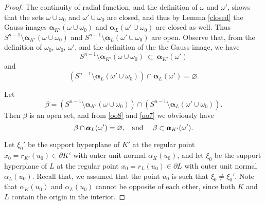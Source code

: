 \documentclass{cpamart1}     %
\theoremstyle{definition}
\theoremstyle{remark}
\newcommand{\sn}{S^{n-1}}
\newcommand{\balpha}{\pmb{\alpha}}
\begin{document}
\begin{proof}
The continuity of radial function,
and the definition of $\omega$ and $\omega'$, shows that the sets
$\omega \cup \omega_0$ and $\omega'\cup \omega_0$ are
closed, and thus by Lemma \ref{closed} the Gauss images $\balpha_{K'}(\omega \cup \omega_0)$
and $\balpha_{L}(\omega' \cup \omega_0)$ are closed as well.
Thus $\sn \setminus\balpha_{K'}(\omega \cup \omega_0)$ and
$\sn \setminus\balpha_{L}(\omega' \cup \omega_0)$ are open.
Observe that, from the definition of $\omega_0$, $\omega_0$, $\omega'$,
and the definition of the the Gauss image, we have
\begin{equation}\label{oo7}
\sn \setminus\balpha_{K'}(\omega \cup \omega_0)\
\subset\  \balpha_{K'}(\omega')
\end{equation}
and
\begin{equation}\label{oo8}
   (\sn \setminus\balpha_{L}(\omega' \cup \omega_0))
 \cap \balpha_{L}(\omega')=\varnothing.
\end{equation}

Let
\begin{equation*}
\beta =
(\sn \setminus\balpha_{K'}(\omega \cup \omega_0))
\cap
(\sn \setminus\balpha_{L}(\omega' \cup \omega_0)).
\end{equation*}
Then $\beta$ is an open set, and from \eqref{oo8} and \eqref{oo7} we obviously have
\begin{equation}\label{u1.3}
\text{$\beta \cap \balpha_{L}(\omega')=\varnothing$,\quad and \quad
$\beta \subset \balpha_{K'}(\omega')$}.
\end{equation}



Let $\xi_0'$ be the support
hyperplane of $K'$ at the regular point $x_0=r_{K'}(u_0) \in \partial K'$
with outer unit normal $\alpha_K(u_0)$, and let $\xi_0$ be the support
hyperplane of $L$ at the regular point $x_0=r_L(u_0)\in \partial L$
with outer unit normal $\alpha_L(u_0)$. Recall that, we assumed that
the point $u_0$ is such that $\xi_0 \neq \xi_0'$. Note that $\alpha_K(u_0)$ and $\alpha_{L}(u_0)$ cannot be opposite of each other, since both $K$ and $L$ contain the origin in the interior.



\end{proof}
\end{document}
